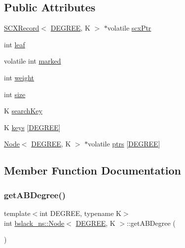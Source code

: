 \subsection*{Public Attributes}
\begin{DoxyCompactItemize}
\item 
\hyperlink{structbslack__ns_1_1SCXRecord}{S\+C\+X\+Record}$<$ \hyperlink{brown__sigouin__abtree__kcas_2adapter_8h_a5d88b17d70c985f2f2b8e987037fd6dd}{D\+E\+G\+R\+EE}, K $>$ $\ast$volatile \hyperlink{structbslack__ns_1_1Node_a86c5301b2a1173bd1b1bc5195242665a}{scx\+Ptr}
\item 
int \hyperlink{structbslack__ns_1_1Node_a8cd3075dbf277f0c8f3d77d2b9b30d32}{leaf}
\item 
volatile int \hyperlink{structbslack__ns_1_1Node_a97deb19c46b0be01965f1986c0f288f8}{marked}
\item 
int \hyperlink{structbslack__ns_1_1Node_a7dd1e7f22c835fd6d45af633cf68685f}{weight}
\item 
int \hyperlink{structbslack__ns_1_1Node_a16b46adbea74fec74c130f68195bd51c}{size}
\item 
K \hyperlink{structbslack__ns_1_1Node_a8409ba747d03413ea0c6a91645015ce2}{search\+Key}
\item 
K \hyperlink{structbslack__ns_1_1Node_a5dbae004ee087044ed203c543839d082}{keys} \mbox{[}\hyperlink{brown__sigouin__abtree__kcas_2adapter_8h_a5d88b17d70c985f2f2b8e987037fd6dd}{D\+E\+G\+R\+EE}\mbox{]}
\item 
\hyperlink{structbslack__ns_1_1Node}{Node}$<$ \hyperlink{brown__sigouin__abtree__kcas_2adapter_8h_a5d88b17d70c985f2f2b8e987037fd6dd}{D\+E\+G\+R\+EE}, K $>$ $\ast$volatile \hyperlink{structbslack__ns_1_1Node_a0de8d925f3eb8033ec776c118b6e121a}{ptrs} \mbox{[}\hyperlink{brown__sigouin__abtree__kcas_2adapter_8h_a5d88b17d70c985f2f2b8e987037fd6dd}{D\+E\+G\+R\+EE}\mbox{]}
\end{DoxyCompactItemize}


\subsection{Member Function Documentation}
\mbox{\label{structbslack__ns_1_1Node_a0a075e319eee98333281f27abd7e0228}} 
\subsubsection{\texorpdfstring{get\+A\+B\+Degree()}{getABDegree()}}
{\footnotesize\ttfamily template$<$int D\+E\+G\+R\+EE, typename K$>$ \\
int \hyperlink{structbslack__ns_1_1Node}{bslack\+\_\+ns\+::\+Node}$<$ \hyperlink{brown__sigouin__abtree__kcas_2adapter_8h_a5d88b17d70c985f2f2b8e987037fd6dd}{D\+E\+G\+R\+EE}, K $>$\+::get\+A\+B\+Degree (\begin{DoxyParamCaption}{ }\end{DoxyParamCaption})\hspace{0.3cm}{\ttfamily [inline]}}

